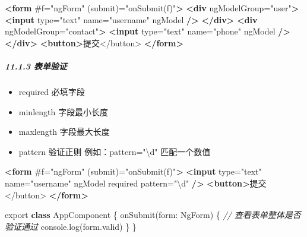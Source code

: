 \documentclass[
]{article}
\newenvironment{Shaded}{}{}
\newcommand{\AttributeTok}[1]{\textcolor[rgb]{0.49,0.56,0.16}{#1}}
\newcommand{\BuiltInTok}[1]{#1}
\newcommand{\CommentTok}[1]{\textcolor[rgb]{0.38,0.63,0.69}{\textit{#1}}}
\newcommand{\DataTypeTok}[1]{\textcolor[rgb]{0.56,0.13,0.00}{#1}}
\newcommand{\FunctionTok}[1]{\textcolor[rgb]{0.02,0.16,0.49}{#1}}
\newcommand{\ImportTok}[1]{#1}
\newcommand{\KeywordTok}[1]{\textcolor[rgb]{0.00,0.44,0.13}{\textbf{#1}}}
\newcommand{\NormalTok}[1]{#1}
\newcommand{\OperatorTok}[1]{\textcolor[rgb]{0.40,0.40,0.40}{#1}}
\newcommand{\OtherTok}[1]{\textcolor[rgb]{0.00,0.44,0.13}{#1}}
\newcommand{\StringTok}[1]{\textcolor[rgb]{0.25,0.44,0.63}{#1}}
\begin{document}
\begin{enumerate}
\begin{Shaded}
\begin{Highlighting}[]
\KeywordTok{\textless{}form}\OtherTok{ \#f=}\StringTok{"ngForm"}\OtherTok{ (submit)=}\StringTok{"onSubmit(f)"}\KeywordTok{\textgreater{}}
  \KeywordTok{\textless{}div}\OtherTok{ ngModelGroup=}\StringTok{"user"}\KeywordTok{\textgreater{}}
    \KeywordTok{\textless{}input}\OtherTok{ type=}\StringTok{"text"}\OtherTok{ name=}\StringTok{"username"}\OtherTok{ ngModel} \KeywordTok{/\textgreater{}}
  \KeywordTok{\textless{}/div\textgreater{}}
  \KeywordTok{\textless{}div}\OtherTok{ ngModelGroup=}\StringTok{"contact"}\KeywordTok{\textgreater{}}
    \KeywordTok{\textless{}input}\OtherTok{ type=}\StringTok{"text"}\OtherTok{ name=}\StringTok{"phone"}\OtherTok{ ngModel} \KeywordTok{/\textgreater{}}
  \KeywordTok{\textless{}/div\textgreater{}}
  \KeywordTok{\textless{}button\textgreater{}}\NormalTok{提交\textless{}/button\textgreater{}}
\KeywordTok{\textless{}/form\textgreater{}}
\end{Highlighting}
\end{Shaded}
\end{enumerate}

\hypertarget{1113-ux8868ux5355ux9a8cux8bc1}{%
\subparagraph{11.1.3 表单验证}\label{1113-ux8868ux5355ux9a8cux8bc1}}

\begin{itemize}
\item
  required 必填字段
\item
  minlength 字段最小长度
\item
  maxlength 字段最大长度
\item
  pattern 验证正则 例如：pattern="\textbackslash d" 匹配一个数值
\end{itemize}

\begin{Shaded}
\begin{Highlighting}[]
\KeywordTok{\textless{}form}\OtherTok{ \#f=}\StringTok{"ngForm"}\OtherTok{ (submit)=}\StringTok{"onSubmit(f)"}\KeywordTok{\textgreater{}}
  \KeywordTok{\textless{}input}\OtherTok{ type=}\StringTok{"text"}\OtherTok{ name=}\StringTok{"username"}\OtherTok{ ngModel required pattern=}\StringTok{"\textbackslash{}d"} \KeywordTok{/\textgreater{}}
  \KeywordTok{\textless{}button\textgreater{}}\NormalTok{提交\textless{}/button\textgreater{}}
\KeywordTok{\textless{}/form\textgreater{}}
\end{Highlighting}
\end{Shaded}

\begin{Shaded}
\begin{Highlighting}[]
\ImportTok{export} \KeywordTok{class}\NormalTok{ AppComponent \{}
  \FunctionTok{onSubmit}\NormalTok{(}\DataTypeTok{form}\OperatorTok{:}\NormalTok{ NgForm) \{}
    \CommentTok{// 查看表单整体是否验证通过}
    \BuiltInTok{console}\OperatorTok{.}\FunctionTok{log}\NormalTok{(form}\OperatorTok{.}\AttributeTok{valid}\NormalTok{)}
\NormalTok{  \}}
\NormalTok{\}}
\end{Highlighting}
\end{Shaded}
\end{document}
